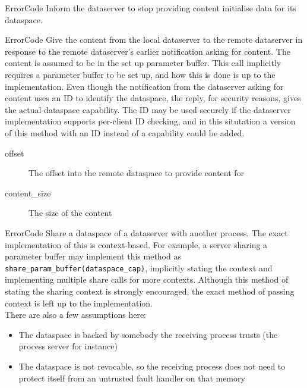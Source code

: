 \begin{description}
    \item {}
        {ErrorCode}
    Inform the dataserver to stop providing content initialise data for its dataspace.

    \item {}
        {ErrorCode}  
    Give the content from the local dataserver to the remote dataserver in response to the remote dataserver's earlier notification asking for content. The content is assumed to be in the set up parameter buffer. This call implicitly requires a parameter buffer to be set up, and how this is done is up to the implementation. Even though the notification from the dataserver asking for content uses an ID to identify the dataspace, the reply, for security reasons, gives the actual dataspace capability. The ID may be used securely if the dataserver implementation supports per-client ID checking, and in this situtation a version of this method with an ID instead of a capability could be added.
    \begin{description}
        \item [offset] The offset into the remote dataspace to provide content for
        \item [content\_size] The size of the content
    \end{description}

    \item {}
        {ErrorCode}
    Share a dataspace of a dataserver with another process. The exact implementation of this is context-based. For example, a server sharing a parameter buffer may implement this method as \texttt{share\_param\_buffer(dataspace\_cap)}, implicitly stating the context and implementing multiple share calls for more contexts. Although this method of stating the sharing context is strongly encouraged, the exact method of passing context is left up to the implementation. \\
    There are also a few assumptions here:
    \begin{itemize}
    \item The dataspace is backed by somebody the receiving process trusts (the process server for instance)
    \item The dataspace is not revocable, so the receiving process does not need to protect itself from an untrusted fault handler on that memory
    \end{itemize}


\end{description}
